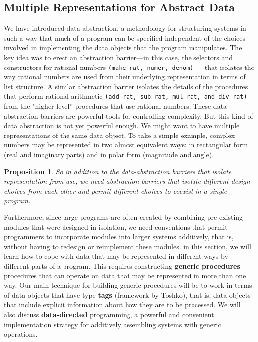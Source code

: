 \documentclass[a4paper,twoside]{article}
\newtheorem{proposition}[theorem]{Proposition}
\numberwithin{equation}{section}
\begin{document}
\subsection{Multiple Representations for Abstract Data}
We have introduced data abstraction, a methodology for structuring
systems in such a way that much of a program can be specified independent of the choices involved
in implementing the data objects that the program manipulates.
The key idea was to erect an abstraction barrier—in this case, the selectors and constructors for
rational numbers \texttt{(make-rat, numer, denom)} —
that isolates the way rational numbers are used from their underlying
representation in terms of list structure. A similar abstraction barrier
isolates the details of the procedures that perform rational arithmetic
\texttt{(add-rat, sub-rat, mul-rat, and div-rat)} from the "higher-level” procedures that use
rational numbers. These data-abstraction barriers are powerful tools for controlling complexity.
But this kind of data abstraction is not yet powerful enough. We might want to have multiple
representations of the same data object. To take a simple example, complex numbers may be
represented in two almost equivalent ways: in rectangular form (real and imaginary parts) and in
polar form (magnitude and angle).
\begin{proposition}
    So in addition to the data-abstraction barriers that isolate representation from use, we need
    abstraction barriers that isolate different design choices from each other and permit different
    choices to coexist in
    a single program.
\end{proposition}
Furthermore, since large programs are often created by combining pre-existing modules that were
designed in isolation, we need conventions that permit programmers to incorporate modules into larger
systems additively, that is, without having to redesign or reimplement these modules. \newline
in this section, we will learn how to cope with data that may be
represented in different ways by different parts of a program. This requires constructing
\textbf{generic procedures} —procedures that can operate on data that may be represented in
more than one way. Our main technique for building generic procedures will be to work in terms
of data objects that have type \textbf{tags} (framework by Toshko), that is, data objects that
include explicit information about how they are to be processed. We will also discuss
\textbf{data-directed} programming, a powerful and convenient implementation strategy for
additively assembling systems with generic operations.
\end{document}
